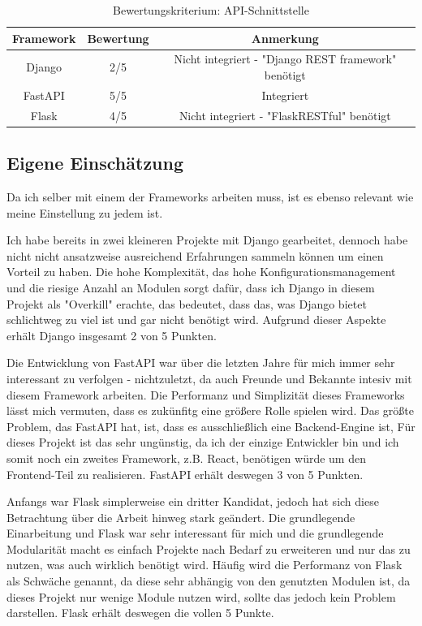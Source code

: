 \documentclass[letterpaper,11pt,leqno]{article}
\begin{document}
\begin{table}[h!]
	\begin{center}
		\begin{tabular}{|c||c|c|}
			\hline
			Framework & Bewertung & Anmerkung\\
			\hline\hline
			Django & 2/5 & Nicht integriert - "Django REST framework" benötigt\\
			FastAPI & 5/5 & Integriert\\
			Flask & 4/5 & Nicht integriert - "FlaskRESTful" benötigt\\
			\hline
		\end{tabular}
		\caption{Bewertungskriterium: API-Schnittstelle}
	\end{center}
	\label{table:5}
\end{table}

\subsection{Eigene Einschätzung}
Da ich selber mit einem der Frameworks arbeiten muss, ist es ebenso relevant wie meine Einstellung zu jedem ist.

Ich habe bereits in zwei kleineren Projekte mit Django gearbeitet, dennoch habe nicht nicht ansatzweise ausreichend Erfahrungen
sammeln können um einen Vorteil zu haben. Die hohe Komplexität, das hohe Konfigurationsmanagement und die riesige Anzahl an Modulen
sorgt dafür, dass ich Django in diesem Projekt als "Overkill" erachte, das bedeutet, dass das, was Django bietet schlichtweg zu viel
ist und gar nicht benötigt wird. Aufgrund dieser Aspekte erhält Django insgesamt 2 von 5 Punkten.

Die Entwicklung von FastAPI war über die letzten Jahre für mich immer sehr interessant zu verfolgen - nichtzuletzt, da auch Freunde
und Bekannte intesiv mit diesem Framework arbeiten. Die Performanz und Simplizität dieses Frameworks lässt mich vermuten, dass es
zukünfitg eine größere Rolle spielen wird. Das größte Problem, das FastAPI hat, ist, dass es ausschließlich eine Backend-Engine ist,
Für dieses Projekt ist das sehr ungünstig, da ich der einzige Entwickler bin und ich somit noch ein zweites Framework, z.B. React,
benötigen würde um den Frontend-Teil zu realisieren. FastAPI erhält deswegen 3 von 5 Punkten.

Anfangs war Flask simplerweise ein dritter Kandidat, jedoch hat sich diese Betrachtung über die Arbeit hinweg stark geändert. Die
grundlegende Einarbeitung und Flask war sehr interessant für mich und die grundlegende Modularität macht es einfach Projekte nach
Bedarf zu erweiteren und nur das zu nutzen, was auch wirklich benötigt wird. Häufig wird die Performanz von Flask als Schwäche
genannt, da diese sehr abhängig von den genutzten Modulen ist, da dieses Projekt nur wenige Module nutzen wird, sollte das jedoch
kein Problem darstellen. Flask erhält deswegen die vollen 5 Punkte.
\end{document}
